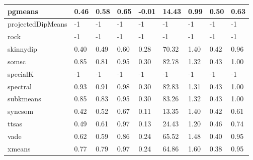 \begin{table}[H]
\begin{tabular}{|l|l|l|l|l|l|l|l|l|}
pgmeans & 0.46 & 0.58 & 0.65 & -0.01 & 14.43 & 0.99 & 0.50 & 0.63 \\
\hline
projectedDipMeans & -1 & -1 & -1 & -1 & -1 & -1 & -1 & -1 \\
\hline
rock & -1 & -1 & -1 & -1 & -1 & -1 & -1 & -1 \\
\hline
skinnydip & 0.40 & 0.49 & 0.60 & 0.28 & 70.32 & 1.40 & 0.42 & 0.96 \\
\hline
somsc & 0.85 & 0.81 & 0.95 & 0.30 & 82.78 & 1.32 & 0.43 & 1.00 \\
\hline
specialK & -1 & -1 & -1 & -1 & -1 & -1 & -1 & -1 \\
\hline
spectral & 0.93 & 0.91 & 0.98 & 0.30 & 82.83 & 1.31 & 0.43 & 1.00 \\
\hline
subkmeans & 0.85 & 0.83 & 0.95 & 0.30 & 83.26 & 1.32 & 0.43 & 1.00 \\
\hline
syncsom & 0.42 & 0.52 & 0.67 & 0.11 & 13.35 & 1.40 & 0.42 & 0.61 \\
\hline
ttsas & 0.49 & 0.61 & 0.97 & 0.13 & 24.43 & 1.20 & 0.46 & 0.74 \\
\hline
vade & 0.62 & 0.59 & 0.86 & 0.24 & 65.52 & 1.48 & 0.40 & 0.95 \\
\hline
xmeans & 0.77 & 0.79 & 0.97 & 0.24 & 64.86 & 1.60 & 0.38 & 0.95 \\
\hline
\end{tabular}
\end{table}



